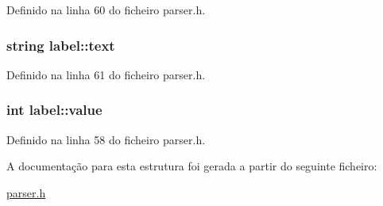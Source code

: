 Definido na linha 60 do ficheiro parser.\-h.

\hypertarget{structlabel_a119fc486bd92631742a9fe2cf278d4df}{
\subsubsection[{text}]{\setlength{\rightskip}{0pt plus 5cm}string label\-::text}}\label{structlabel_a119fc486bd92631742a9fe2cf278d4df}


Definido na linha 61 do ficheiro parser.\-h.

\hypertarget{structlabel_ac0cdaf20932b7fe75988a1d08510b72c}{
\subsubsection[{value}]{\setlength{\rightskip}{0pt plus 5cm}int label\-::value}}\label{structlabel_ac0cdaf20932b7fe75988a1d08510b72c}


Definido na linha 58 do ficheiro parser.\-h.



A documentação para esta estrutura foi gerada a partir do seguinte ficheiro\-:\begin{DoxyCompactItemize}
\item 
\hyperlink{parser_8h}{parser.\-h}\end{DoxyCompactItemize}
